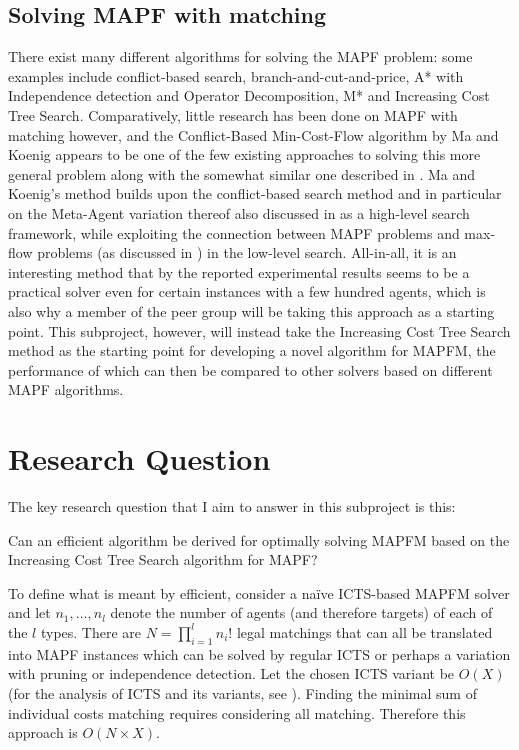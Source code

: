 \documentclass[a4paper,10pt,english]{article}
\begin{document}
	\subsection*{Solving MAPF with matching}
	There exist many different algorithms for solving the MAPF problem: some examples include conflict-based search\cite{sharon2015}, branch-and-cut-and-price\cite{lam2019}, A* with Independence detection and Operator Decomposition\cite{standley2010}, M*\cite{wagner2011} and Increasing Cost Tree Search\cite{sharon2011}. Comparatively, little research has been done on MAPF with matching however, and the Conflict-Based Min-Cost-Flow algorithm by Ma and Koenig \cite{ma2016} appears to be one of the few existing approaches to solving this more general problem along with the somewhat similar one described in \cite{henkel2019}. Ma and Koenig's method builds upon the conflict-based search method and in particular on the Meta-Agent variation thereof also discussed in \cite{sharon2015} as a high-level search framework, while exploiting the connection between MAPF problems and max-flow problems (as discussed in \cite{yu2013}) in the low-level search. All-in-all, it is an interesting method that by the reported experimental results seems to be a practical solver even for certain instances with a few hundred agents, which is also why a member of the peer group will be taking this approach as a starting point. This subproject, however, will instead take the Increasing Cost Tree Search method as the starting point for developing a novel algorithm for MAPFM, the performance of which can then be compared to other solvers based on different MAPF algorithms.
	
	
	\section*{Research Question}
	The key research question that I aim to answer in this subproject is this:\begin{center}
		Can an efficient algorithm be derived for optimally solving MAPFM based on the Increasing Cost Tree Search algorithm for MAPF? 
	\end{center} 
	To define what is meant by efficient, consider a naïve ICTS-based MAPFM solver and let $n_1,\ldots,n_l$ denote the number of agents (and therefore targets) of each of the $l$ types. There are $N = \prod_{i = 1}^l n_i!$ legal matchings that can all be translated into MAPF instances which can be solved by regular ICTS or perhaps a variation with pruning or independence detection. Let the chosen ICTS variant be $O(X)$ (for the analysis of ICTS and its variants, see \cite{sharon2011}). Finding the minimal sum of individual costs matching requires considering all matching. Therefore this approach is $O(N\times X)$. 
	
\end{document}
